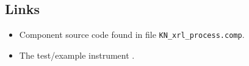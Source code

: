 \subsection*{Links}
\begin{itemize}
  \item Component source code found in file \texttt{KN\_xrl\_process.comp}.
  \item The test/example instrument .
\end{itemize}
